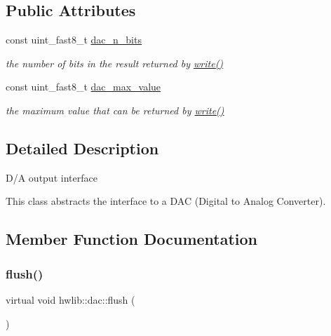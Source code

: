 \subsection*{Public Attributes}
\begin{DoxyCompactItemize}
\item 
\mbox{\label{classhwlib_1_1dac_a031625f8cbcb88bebd48a76aa19bfcb5}} 
const uint\+\_\+fast8\+\_\+t \hyperlink{classhwlib_1_1dac_a031625f8cbcb88bebd48a76aa19bfcb5}{dac\+\_\+n\+\_\+bits}
\begin{DoxyCompactList}\small\item\em the number of bits in the result returned by \hyperlink{classhwlib_1_1dac_ac1572029354d3334b053b4d4966b7208}{write()} \end{DoxyCompactList}\item 
\mbox{\label{classhwlib_1_1dac_ae0546b0bcfa18c53a37a0285dc77f04c}} 
const uint\+\_\+fast8\+\_\+t \hyperlink{classhwlib_1_1dac_ae0546b0bcfa18c53a37a0285dc77f04c}{dac\+\_\+max\+\_\+value}
\begin{DoxyCompactList}\small\item\em the maximum value that can be returned by \hyperlink{classhwlib_1_1dac_ac1572029354d3334b053b4d4966b7208}{write()} \end{DoxyCompactList}\end{DoxyCompactItemize}


\subsection{Detailed Description}
D/A output interface

This class abstracts the interface to a D\+AC (Digital to Analog Converter). 

\subsection{Member Function Documentation}
\mbox{\label{classhwlib_1_1dac_ab25a6ae2d86b0bec3afdecf3d22faf67}} 
\subsubsection{\texorpdfstring{flush()}{flush()}}
{\footnotesize\ttfamily virtual void hwlib\+::dac\+::flush (\begin{DoxyParamCaption}{ }\end{DoxyParamCaption})\hspace{0.3cm}{\ttfamily [pure virtual]}}

